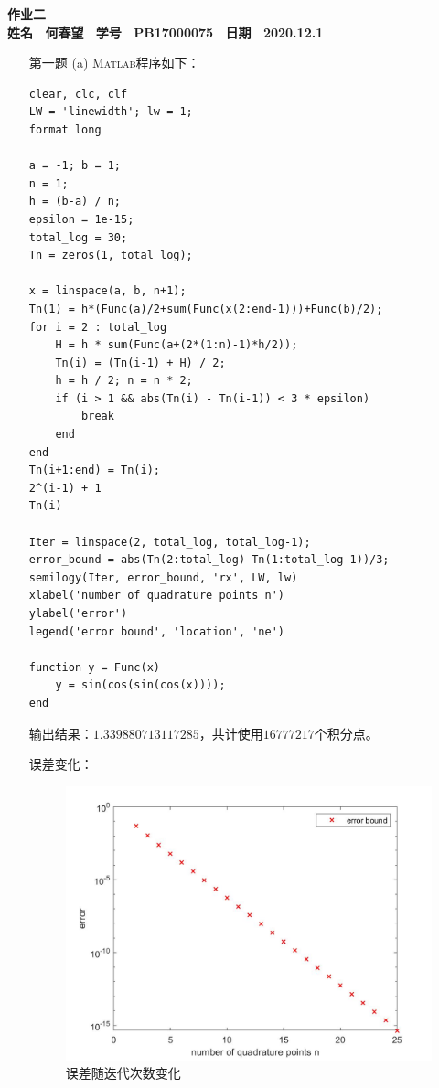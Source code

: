 \documentclass[12pt,a4paper,utf8]{ctexart}
\begin{document}

\begin{center}
\textbf{作业二}\\
\textbf{姓名 ~何春望~ 学号 ~PB17000075~ 日期 ~2020.12.1}\\
\end{center}
\textit{}
\vspace{\baselineskip}

\begin{enumerate}
\item[第一题] 
\subitem(a)
\textsc{Matlab}程序如下：
\begin{lstlisting}[frame=single]
clear, clc, clf
LW = 'linewidth'; lw = 1;
format long

a = -1; b = 1;
n = 1;
h = (b-a) / n;
epsilon = 1e-15;
total_log = 30;
Tn = zeros(1, total_log);

x = linspace(a, b, n+1);
Tn(1) = h*(Func(a)/2+sum(Func(x(2:end-1)))+Func(b)/2);
for i = 2 : total_log
    H = h * sum(Func(a+(2*(1:n)-1)*h/2));
    Tn(i) = (Tn(i-1) + H) / 2;
    h = h / 2; n = n * 2;
    if (i > 1 && abs(Tn(i) - Tn(i-1)) < 3 * epsilon)
        break
    end
end
Tn(i+1:end) = Tn(i);
2^(i-1) + 1
Tn(i)

Iter = linspace(2, total_log, total_log-1);
error_bound = abs(Tn(2:total_log)-Tn(1:total_log-1))/3;
semilogy(Iter, error_bound, 'rx', LW, lw)
xlabel('number of quadrature points n')
ylabel('error')
legend('error bound', 'location', 'ne')

function y = Func(x)
    y = sin(cos(sin(cos(x))));
end
\end{lstlisting}

输出结果：$1.339880713117285$，共计使用$16777217$个积分点。

误差变化：

\begin{figure}[H]
    \centering
    \includegraphics[width = .8\textwidth]{1a.jpg}
    \caption{误差随迭代次数变化}
\end{figure}


\end{enumerate}
\end{document}
